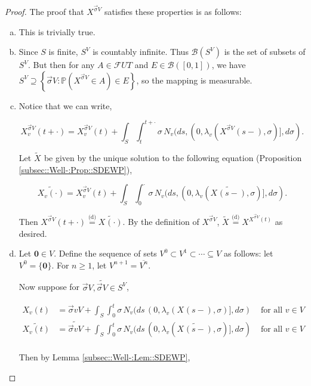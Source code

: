 \documentclass[12pt]{article}
\newcommand{\mb}{\mathbb}
\newcommand{\mc}{\mathcal}
\newcommand{\ms}{\mathscr}
\newcommand{\ov}{\overline}
\newcommand{\te}{\text}
\newcommand{\ind}{\hspace{24pt}}
\newcommand{\pr}{\mb{P}}							%
\newcommand{\deq}{\overset{\text{(d)}}{=}}			%
\renewcommand{\root}{\mathbf{0}}				%
\renewcommand{\v}{v}							%
\renewcommand{\U}{U}							%
\renewcommand{\S}{S}							%
\newcommand{\s}{\sigma}							%
\newcommand{\sv}{\vec{\s}}						%
\newcommand{\T}{T}								%
\renewcommand{\t}{t}							%
\renewcommand{\tt}{s}							%
\newcommand{\F}{\mc{F}}							%
\newcommand{\cl}{\ov}							%
\newcommand{\poiss}[1]{N_{#1}}						%
\newcommand{\pup}[1]{^{#1}}							%
\newcommand{\V}{V}									%
\newcommand{\numb}{n}								%
\newcommand{\XState}[1]{\S^{#1}}				%
\newcommand{\rxvt}[2]{X_{#1}{(#2)}}					%
\newcommand{\rxvtn}[3]{X_{#1}^{#3}(#2)}				%
\newcommand{\rxvts}[2]{X_{#1}{#2}}					%
\newcommand{\rxvtsn}[3]{X_{#1}^{#3}{#2}}			%
\newcommand{\rate}[1]{\lambda_{#1}}					%
\newcommand{\alt}{\widetilde}						%
\begin{document}
\begin{proof}
The proof that \(\rxvtsn{}{}{\sv{}{\V}}\) satisfies these properties is as follows:

\begin{enumerate}[(a)]
\item This is trivially true.

\item Since \(\S\) is finite, \(\S^\V\) is countably infinite. Thus \(\ms{B}(\S^\V)\) is the set of subsets of \(\S^\V\). But then for any \(A \in \F{\U}{\T}\) and \(E \in \ms{B}([0,1])\), we have \(\S^\V \supseteq \left\{\sv{}{\V}: \pr\left(\rxvtsn{}{}{\sv{}{\V}} \in A\right) \in E\right\}\), so the mapping is measurable.

\item Notice that we can write,

\[\rxvtn{\v}{\t+\cdot}{\sv{}{\V}} = \rxvtn{\v}{\t}{\sv{}{\V}} + \int_\S\int_\t^{\t+\cdot} \s\,\poiss{\v}(d\tt,(0,\rate{\v}(\rxvtn{}{\tt-}{\sv{}{\V}},\s)],d\s).\]

Let \(\alt{\rxvts{}{}}\) be given by the unique solution to the following equation (Proposition \ref{subsec::Well-:Prop::SDEWP}),

\[\alt{\rxvt{\v}{\cdot}} = \rxvtn{\v}{\t}{\sv{}{\V}} + \int_\S \int_0^\cdot \s\,\poiss{\v}(d\tt,(0,\rate{\v}(\alt{\rxvt{}{\tt-}},\s)],d\s).\]

Then \(\rxvtn{}{\t+\cdot}{\sv{}{\V}} \deq \alt{\rxvt{}{\cdot}}\). By the definition of \(\rxvtsn{}{}{\sv{}{\V}}\), \(\alt{\rxvts{}{}} \deq \rxvtsn{}{}{\rxvtn{}{\t}{\sv{}{\V}}}\) as desired.

\item Let \(\root \in \V\). Define the sequence of sets \(\V\pup{0}\subset \V\pup{1}\subset \cdots \subseteq \V\) as follows: let \(\V\pup{0} = \{\root\}\). For \(\numb \geq 1\), let \(\V\pup{\numb+1} = \cl{\V\pup{\numb}}\).

\ind Now suppose for \(\sv{}{\V},\alt{\sv{}{\V}}\in \S^\V\),

\begin{align*}
\rxvt{\v}{\t} &= \sv{\v}{\V} + \int_\S\int_0^\t \s\,\poiss{\v}(d\tt\,(0,\rate{\v}(\rxvt{}{\tt-},\s)],d\s)&\te{ for all } \v \in \V\\
\alt{\rxvt{\v}{\t}} &= \alt{\sv{\v}{\V}} + \int_\S\int_0^\t \s\,\poiss{\v}(d\tt\,(0,\rate{\v}(\alt{\rxvt{}{\tt-}},\s)],d\s)&\te{ for all } \v \in \V\\
\end{align*}

Then by Lemma \ref{subsec::Well-:Lem::SDEWP},


\end{enumerate}
\end{proof}
\end{document}
